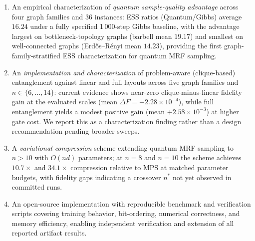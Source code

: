     
    
    \begin{enumerate}[leftmargin=*]
        \item An empirical characterization of \emph{quantum sample-quality
        advantage} across four graph families and 36 instances: ESS ratios
        (Quantum/Gibbs) average $16.24$ under a fully specified 1\,000-step
        Gibbs baseline, with the advantage largest on bottleneck-topology
        graphs (barbell mean $19.17$) and smallest on well-connected graphs
        (Erd\H{o}s--R\'enyi mean $14.23$), providing the first
        graph-family-stratified ESS characterization for quantum MRF
        sampling.
    
        \item An \emph{implementation and characterization} of problem-aware
        (clique-based) entanglement against linear and full layouts across
        five graph families and $n \in \{6, \ldots, 14\}$: current evidence
        shows near-zero clique-minus-linear fidelity gain at the evaluated
        scales (mean $\Delta F = -2.28 \times 10^{-4}$), while full
        entanglement yields a modest positive gain (mean $+2.58 \times
        10^{-3}$) at higher gate cost. We report this as a characterization
        finding rather than a design recommendation pending broader sweeps.
    
        \item A \emph{variational compression} scheme extending quantum MRF
        sampling to $n > 10$ with $O(nd)$ parameters; at $n = 8$ and $n =
        10$ the scheme achieves $10.7\times$ and $34.1\times$ compression
        relative to MPS at matched parameter budgets, with fidelity gaps
        indicating a crossover $n^*$ not yet observed in committed runs.
    
        \item An open-source implementation with reproducible benchmark and
        verification scripts covering training behavior, bit-ordering,
        numerical correctness, and memory efficiency, enabling independent
        verification and extension of all reported artifact results.
    \end{enumerate}
    

